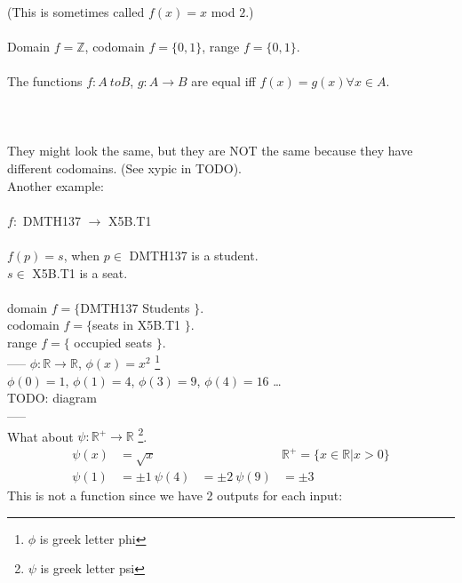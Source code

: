\\
(This is sometimes called $f(x) = x$ mod $2$.)\\
\\
Domain $f = \mathbb{Z}$, codomain $f = \{0,1\}$, range $f = \{0,1\}$.\\
\\
The functions $f: A\ to B$, $g: A \to B$ are equal iff $f(x) = g(x) \forall x \in A$.\\
\\
\\
\\
They might look the same, but they are NOT the same because they have different codomains.
(See xypic in TODO).
\\
Another example: \\
\\
$f:$ DMTH137 $\to$ X5B.T1 \\
\\
$f(p) = s$, when $p \in $ DMTH137 is a student. \\
$s \in $ X5B.T1 is a seat. \\
\\
domain $f = \{$DMTH137 Students $\}$. \\
codomain $f = \{$seats in X5B.T1 $\}$. \\
range $f = \{$ occupied seats $\}$. \\

-----
$\phi : \mathbb{R} \to \mathbb{R}$, $\phi(x) = x^2$ \footnote{$\phi$ is greek letter phi} \\
$\phi(0) = 1$, $\phi(1) = 4$, $\phi(3) = 9$, $\phi(4) = 16$ \ldots \\

TODO: diagram \\
----- \\
What about $\psi: \mathbb{R}^{+} \to \mathbb{R}$ \footnote{$\psi$ is greek letter psi}.
\begin{align}
  \psi(x) & = \sqrt{x} && \mathbb{R}^{+} = \{x \in \mathbb{R} | x > 0 \} \nonumber \\
  \psi(1) & = \pm 1 \
  \psi(4) & = \pm 2 \
  \psi(9) & = \pm 3 \
\end{align}
This is not a function since we have 2 outputs for each input:

